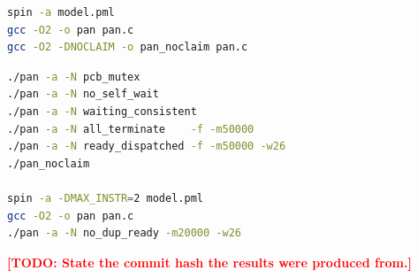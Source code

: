 \documentclass[11pt,a4paper]{article}
\newcommand{\todo}[1]{\textcolor{red}{\textbf{[TODO: #1]}}}
\begin{document}

\begin{lstlisting}[language=bash,caption={Build}]
spin -a model.pml
gcc -O2 -o pan pan.c
gcc -O2 -DNOCLAIM -o pan_noclaim pan.c
\end{lstlisting}

\begin{lstlisting}[language=bash,caption={Verification runs}]
./pan -a -N pcb_mutex
./pan -a -N no_self_wait
./pan -a -N waiting_consistent
./pan -a -N all_terminate    -f -m50000
./pan -a -N ready_dispatched -f -m50000 -w26
./pan_noclaim

spin -a -DMAX_INSTR=2 model.pml
gcc -O2 -o pan pan.c
./pan -a -N no_dup_ready -m20000 -w26
\end{lstlisting}

\todo{State the commit hash the results were produced from.}



\end{document}
